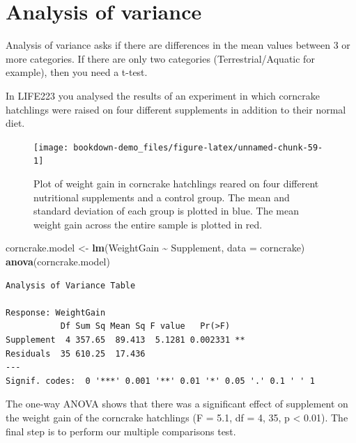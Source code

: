 \documentclass[
]{book}
\newenvironment{Shaded}{\begin{snugshade}}{\end{snugshade}}
\newcommand{\DataTypeTok}[1]{\textcolor[rgb]{0.13,0.29,0.53}{#1}}
\newcommand{\KeywordTok}[1]{\textcolor[rgb]{0.13,0.29,0.53}{\textbf{#1}}}
\newcommand{\NormalTok}[1]{#1}
\newcommand{\OperatorTok}[1]{\textcolor[rgb]{0.81,0.36,0.00}{\textbf{#1}}}
\newcommand{\StringTok}[1]{\textcolor[rgb]{0.31,0.60,0.02}{#1}}
\begin{document}
\hypertarget{analysis-of-variance}{%
\section{Analysis of variance}\label{analysis-of-variance}}

Analysis of variance asks if there are differences in the mean values between 3 or more categories. If there are only two categories (Terrestrial/Aquatic for example), then you need a t-test.

In LIFE223 you analysed the results of an experiment in which corncrake hatchlings were raised on four different supplements in addition to their normal diet.

\begin{figure}[H]

{\centering \texttt{[image: bookdown-demo\_files/figure-latex/unnamed-chunk-59-1]} 

}

\caption{Plot of weight gain in corncrake hatchlings reared on four different nutritional supplements and a control group. The mean and standard deviation of each group is plotted in blue. The mean weight gain across the entire sample is plotted in red.}\label{fig:unnamed-chunk-59}
\end{figure}

\begin{Shaded}
\begin{Highlighting}[]
\NormalTok{corncrake.model \textless{}{-}}\StringTok{ }\KeywordTok{lm}\NormalTok{(WeightGain }\OperatorTok{\textasciitilde{}}\StringTok{ }\NormalTok{Supplement, }\DataTypeTok{data =}\NormalTok{ corncrake)}
\KeywordTok{anova}\NormalTok{(corncrake.model)}
\end{Highlighting}
\end{Shaded}

\begin{verbatim}
Analysis of Variance Table

Response: WeightGain
           Df Sum Sq Mean Sq F value   Pr(>F)   
Supplement  4 357.65  89.413  5.1281 0.002331 **
Residuals  35 610.25  17.436                    
---
Signif. codes:  0 '***' 0.001 '**' 0.01 '*' 0.05 '.' 0.1 ' ' 1
\end{verbatim}

The one-way ANOVA shows that there was a significant effect of supplement on the weight gain of the corncrake hatchlings (F = 5.1, df = 4, 35, p \textless{} 0.01). The final step is to perform our multiple comparisons test.
\end{document}
